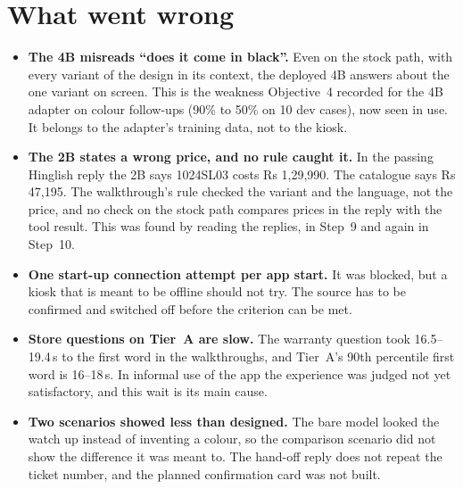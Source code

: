 \documentclass[11pt,a4paper]{article}
\begin{document}
\section{What went wrong}\label{sec:wrong}
\begin{itemize}
  \item \textbf{The 4B misreads ``does it come in black''.} Even on the stock path, with every variant of the design in
        its context, the deployed 4B answers about the one variant on screen. This is the weakness Objective~4 recorded for
        the 4B adapter on colour follow-ups (90\% to 50\% on 10 dev cases), now seen in use. It belongs to the adapter's
        training data, not to the kiosk.
  \item \textbf{The 2B states a wrong price, and no rule caught it.} In the passing Hinglish reply the 2B says 1024SL03
        costs Rs 1,29,990. The catalogue says Rs 47,195. The walkthrough's rule checked the variant and the language, not
        the price, and no check on the stock path compares prices in the reply with the tool result. This was found by
        reading the replies, in Step~9 and again in Step~10.
  \item \textbf{One start-up connection attempt per app start.} It was blocked, but a kiosk that is meant to be offline
        should not try. The source has to be confirmed and switched off before the criterion can be met.
  \item \textbf{Store questions on Tier~A are slow.} The warranty question took 16.5--19.4\,s to the first word in the
        walkthroughs, and Tier~A's 90th percentile first word is 16--18\,s. In informal use of the app the experience
        was judged not yet satisfactory, and this wait is its main cause.
  \item \textbf{Two scenarios showed less than designed.} The bare model looked the watch up instead of inventing a
        colour, so the comparison scenario did not show the difference it was meant to. The hand-off reply does not
        repeat the ticket number, and the planned confirmation card was not built.
\end{itemize}

\end{document}
